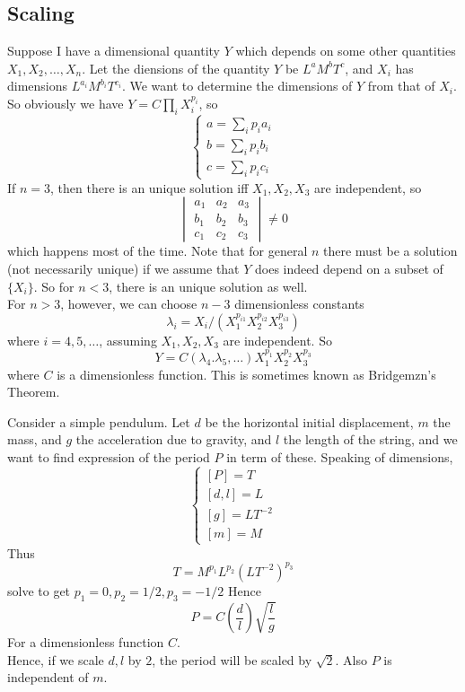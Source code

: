 \subsection{Scaling}
Suppose I have a dimensional quantity $Y$ which depends on some other quantities $X_1,X_2,\ldots,X_n$.
Let the diensions of the quantity $Y$ be $L^aM^bT^c$, and $X_i$ has dimensions $L^{a_i}M^{b_i}T^{c_i}$.
We want to determine the dimensions of $Y$ from that of $X_i$.
So obviously we have $Y=C\prod_i X_i^{p_i}$, so
$$\begin{cases}
    a=\sum_ip_ia_i\\
    b=\sum_ip_ib_i\\
    c=\sum_ip_ic_i
\end{cases}$$
If $n=3$, then there is an unique solution iff $X_1,X_2,X_3$ are independent, so
$$\begin{vmatrix}
    a_1&a_2&a_3\\
    b_1&b_2&b_3\\
    c_1&c_2&c_3
\end{vmatrix}\neq 0$$
which happens most of the time.
Note that for general $n$ there must be a solution (not necessarily unique) if we assume that $Y$ does indeed depend on a subset of $\{X_i\}$.
So for $n<3$, there is an unique solution as well.\\
For $n>3$, however, we can choose $n-3$ dimensionless constants
$$\lambda_i=X_i/(X_1^{p_{i1}}X_2^{p_{i2}}X_3^{p_{i3}})$$
where $i=4,5,\ldots$, assuming $X_1,X_2,X_3$ are independent.
So
$$Y=C(\lambda_4.\lambda_5,\ldots)X_1^{p_1}X_2^{p_2}X_3^{p_3}$$
where $C$ is a dimensionless function.
This is sometimes known as Bridgemzn's Theorem.
\begin{example}
    Consider a simple pendulum.
    Let $d$ be the horizontal initial displacement, $m$ the mass, and $g$ the acceleration due to gravity, and $l$ the length of the string, and we want to find expression of the period $P$ in term of these.
    Speaking of dimensions,
    $$\begin{cases}
        [P]=T\\
        [d,l]=L\\
        [g]=LT^{-2}\\
        [m]=M
    \end{cases}$$
    Thus
    $$T=M^{p_1}L^{p_2}(LT^{-2})^{p_3}$$
    solve to get $p_1=0,p_2=1/2,p_3=-1/2$
    Hence
    $$P=C\left( \frac{d}{l} \right)\sqrt{\frac{l}{g}}$$
    For a dimensionless function $C$.\\
    Hence, if we scale $d,l$ by $2$, the period will be scaled by $\sqrt{2}$.
    Also $P$ is independent of $m$.
\end{example}
